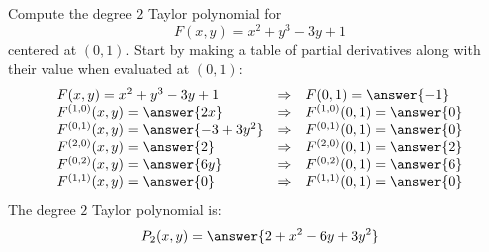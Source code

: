 \documentclass{ximera}
\author{Bart Snapp}
\begin{document}
\begin{exercise}
  Compute the degree $2$ Taylor polynomial for
  \[
  F(x,y) = x^2 + y^3 - 3 y + 1
  \]
  centered at $(0,1)$. Start by making a table of partial
  derivatives along with their value when evaluated at $(0,1)$:
  \[
  \begin{array}{lcl}
    F(x,y) = x^2 + y^3 - 3 y + 1 & \Rightarrow &F(0,1) = \answer{-1}\\
    F^{(1,0)}(x,y) = \answer{2x} & \Rightarrow & F^{(1,0)}(0,1) = \answer{0}\\
    F^{(0,1)}(x,y) = \answer{-3+3y^2} &\Rightarrow  & F^{(0,1)}(0,1) = \answer{0}\\
    F^{(2,0)}(x,y) = \answer{2} &\Rightarrow & F^{(2,0)}(0,1) = \answer{2}\\
    F^{(0,2)}(x,y) = \answer{6y} &\Rightarrow & F^{(0,2)}(0,1) = \answer{6}\\
    F^{(1,1)}(x,y) = \answer{0} &\Rightarrow & F^{(1,1)}(0,1) = \answer{0}
    \end{array}
    \]
    The degree $2$ Taylor polynomial is:
    \[
    P_2(x,y) =\answer{2+x^2-6y+3y^2}
    \]
\end{exercise}
\end{document}
